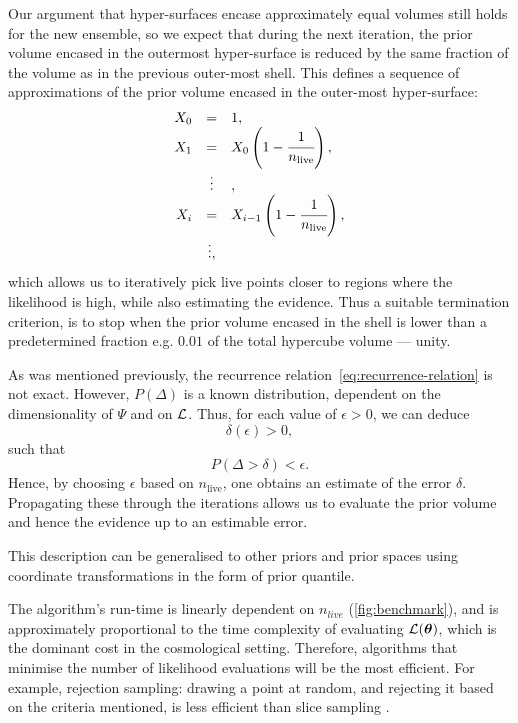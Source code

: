 \documentclass[usenatbib]{mnras}
\begin{document}
Our argument that hyper-surfaces encase approximately equal volumes
still holds for the new ensemble, so we expect that during the next
iteration, the prior volume encased in the outermost hyper-surface
is reduced by the same fraction of the volume as in the previous
outer-most shell. This defines a sequence of approximations of the
prior volume encased in the outer-most hyper-surface:
\begin{equation}\label{eq:recurrence-relation}
  \begin{array}{rcl}
  X_{0} &=  &1, \\
  X_{1} &= &X_{0} \left(1- \cfrac{1}{n_\text{live}}\right),\\
  & \vdots &, \\
  X_{i} &= &X_{i-1}\left(1- \cfrac{1}{n_\text{live}}\right),\\
  & \vdots, &
\end{array}
\end{equation}
which allows us to iteratively pick live points closer to regions
where the likelihood is high, while also estimating the
evidence. Thus a suitable termination criterion, is to stop when
the prior volume encased in the shell is lower than a predetermined
fraction e.g. \(0.01\) of the total hypercube volume --- unity.

As was mentioned previously, the recurrence
relation~\eqref{eq:recurrence-relation} is not exact. However,
\(P(\Delta)\) is a known distribution, dependent on the dimensionality
of \(\Psi\) and on \({\cal L}\). Thus, for each value of
\(\epsilon>0\), we can deduce
\[\delta(\epsilon) >0,\] such that \[P(\Delta > \delta)<\epsilon.\]
Hence, by choosing \(\epsilon\) based on \(n_\text{live}\), one
obtains an estimate of the error \(\delta\). Propagating these through
the iterations allows us to evaluate the prior volume and hence the
evidence up to an estimable error.

This description can be generalised to other priors and prior spaces
using coordinate transformations in the form of prior quantile.



The algorithm's run-time is linearly dependent on \(n_{live}\)
(\cref{fig:benchmark}), and is approximately proportional to the
time complexity of evaluating \({\cal L}(\bm{\theta})\), which is the
dominant cost in the cosmological setting. Therefore, algorithms
that minimise the number of likelihood evaluations will be the most
efficient. For example, rejection sampling: drawing a point at
random, and rejecting it based on the criteria mentioned, is less
efficient than slice sampling \citep{Neal_2003}.
\end{document}
